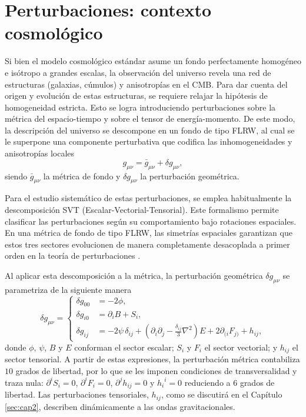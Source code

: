 \section{Perturbaciones: contexto cosmológico}\label{SVT}

Si bien el modelo cosmológico estándar asume un fondo perfectamente homogéneo e isótropo a grandes escalas, la observación del universo revela una red de estructuras (galaxias, cúmulos) y anisotropías en el  CMB. Para dar cuenta del origen y evolución de estas estructuras, se requiere relajar la hipótesis de homogeneidad estricta. Esto se logra introduciendo perturbaciones sobre la métrica del espacio-tiempo y sobre el tensor de energía-momento. De este modo, la descripción del universo se descompone en un fondo de tipo FLRW, al cual se le superpone una componente perturbativa que codifica las inhomogeneidades y anisotropías locales \cite{Weinberg, Doddelson, Peter_2009}
\begin{equation}
    g_{\mu\nu} = \bar{g}_{\mu\nu} + \delta g_{\mu\nu},
\end{equation}
siendo $\bar{g}_{\mu\nu}$ la métrica de fondo y $\delta g_{\mu\nu}$ la perturbación geométrica.

Para el estudio sistemático de estas perturbaciones, se emplea habitualmente la descomposición SVT (Escalar-Vectorial-Tensorial). Este formalismo permite clasificar las perturbaciones según su comportamiento bajo rotaciones espaciales. En una métrica de fondo de tipo FLRW, las simetrías espaciales garantizan que estos tres sectores evolucionen de manera completamente desacoplada a primer orden en la teoría de perturbaciones \cite{Baumann_2012, Weinberg, Doddelson}.

Al aplicar esta descomposición a la métrica, la perturbación geométrica $\delta g_{\mu\nu}$ se parametriza de la siguiente manera
\begin{equation}
    \delta g_{\mu\nu} = \begin{cases}
        \delta g_{00} &= - 2 \phi, \\
        \delta g_{i0} &= \partial_i B + S_i, \\
        \delta g_{ij} &= \displaystyle - 2 \psi \, \delta_{ij} + \left( \partial_i \partial_j - \frac{\delta_{ij}}{3} \nabla^2 \right) E + 2 \partial_{(i} F_{j)} + h_{ij},
    \end{cases}
\end{equation}
donde $\phi$, $\psi$, $B$ y $E$ conforman el sector escalar; $S_i$ y $F_i$ el sector vectorial; y $h_{ij}$ el sector tensorial. A partir de estas expresiones, la perturbación métrica contabiliza $10$ grados de libertad, por lo que se les imponen condiciones de transversalidad y traza nula: $\partial^i S_i = 0$, $\partial^i F_i = 0$, $\partial^j h_{ij} = 0$ y ${h_i}^i = 0$ reduciendo a $6$ grados de libertad. Las perturbaciones tensoriales, $h_{ij}$, como se discutirá en el Capítulo \ref{sec:cap2}, describen dinámicamente a las ondas gravitacionales. 

